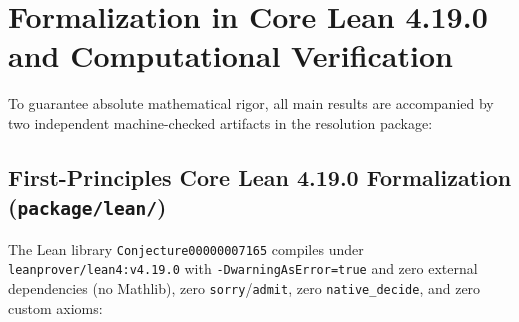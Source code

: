 \documentclass[11pt,a4paper]{article}
\theoremstyle{definition}
\theoremstyle{remark}
\begin{document}
\section{Formalization in Core Lean 4.19.0 and Computational Verification}
\label{sec:formalization}

To guarantee absolute mathematical rigor, all main results are accompanied by two independent machine-checked artifacts in the resolution package:

\subsection{First-Principles Core Lean 4.19.0 Formalization (\texttt{package/lean/})}
The Lean library \texttt{Conjecture00000007165} compiles under \texttt{leanprover/lean4:v4.19.0} with \texttt{-DwarningAsError=true} and zero external dependencies (no Mathlib), zero \texttt{sorry}/\texttt{admit}, zero \texttt{native\_decide}, and zero custom axioms:
\end{document}
